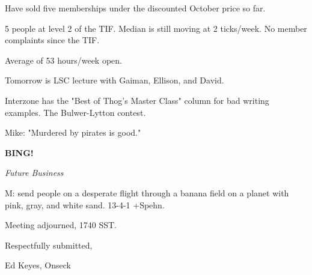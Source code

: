 \documentclass[12pt]{article}
\newcommand{\bing}{{\bf BING!} }
\newcommand{\goto}[1]{\bing \vskip 12pt \centerline{{\em{#1}}}}
\begin{document}
Have sold five memberships under the discounted October price so far.

5 people at level 2 of the TIF. Median is still moving at 2 ticks/week. No member complaints since the TIF.

Average of 53 hours/week open.

Tomorrow is LSC lecture with Gaiman, Ellison, and David.

Interzone has the "Best of Thog's Master Class" column for bad writing examples. The Bulwer-Lytton contest.

Mike: "Murdered by pirates is good."

\goto{Future Business}

M: send people on a desperate flight through a banana field on a planet with pink, gray, and white sand. 13-4-1 +Spehn.

\vspace{12pt}

\noindent
Meeting adjourned, 1740 SST.

\vspace{18pt}

\centerline{Respectfully submitted,}
\centerline{Ed Keyes, Onseck}
\end{document}

